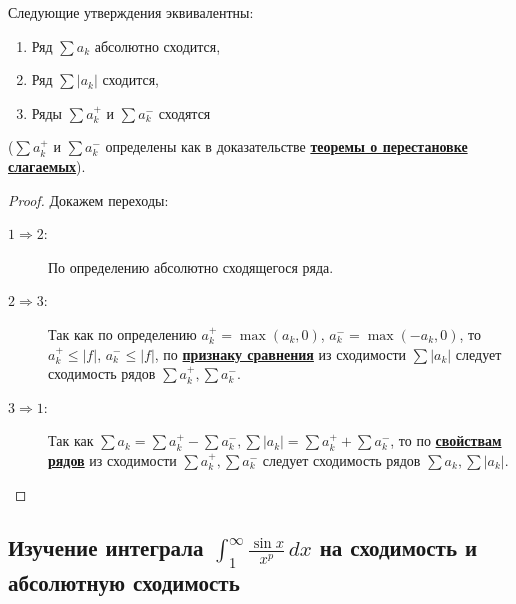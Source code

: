 \begin{ntheorem}[из будущего]
	Следующие утверждения эквивалентны:
	\begin{enumerate}
		\item Ряд \(\sum a_k\) абсолютно сходится,
		\item Ряд \(\sum |a_k|\) сходится,
		\item Ряды \(\sum a_k^+\) и \(\sum a_k^-\) сходятся
	\end{enumerate}
	\big(\(\sum a_k^+\) и \(\sum a_k^-\) определены как в доказательстве \hyperlink{теорема о перестановке слагаемых}{\bfseries теоремы о перестановке слагаемых}\big).
\end{ntheorem}
\begin{proof}
	Докажем переходы:
	\begin{description}
		\item[\(1 \Rightarrow 2\):] По определению абсолютно сходящегося ряда.
		\item[\(2 \Rightarrow 3\):] Так как по определению \(a_k^+ = \max (a_k, 0)\), \(a_k^- = \max (-a_k, 0)\), то \(a_k^+ \leqslant |f|\), \(a_k^- \leqslant |f|\), по \hyperlink{признак сравнения рядов}{\bfseries признаку сравнения} из сходимости \(\sum |a_k|\) следует сходимость рядов \(\sum a_k^+, \sum a_k^-\).
		\item[\(3 \Rightarrow 1\):] Так как \(\sum a_k = \sum a_k^+ - \sum a_k^-, \sum |a_k| = \sum a_k^+ + \sum a_k^-\), то по \hyperlink{свойства рядов}{\bfseries свойствам рядов} из сходимости \(\sum a_k^+, \sum a_k^-\) следует сходимость рядов \(\sum a_k, \sum |a_k|\).
	\end{description}
\end{proof}

\subsection{Изучение интеграла $\int_1^{\infty} \frac{\sin x}{x^p} \, dx$ на сходимость и абсолютную сходимость}

